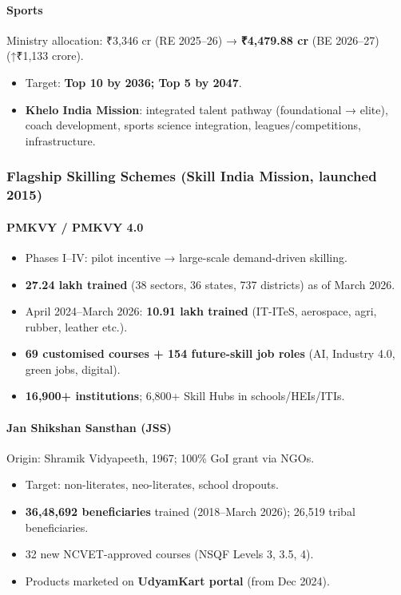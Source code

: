 \paragraph{Sports} Ministry allocation: ₹3,346 cr (RE 2025--26) → \textbf{₹4,479.88 cr} (BE 2026--27) (↑₹1,133 crore).
\begin{itemize}
  \item Target: \textbf{Top 10 by 2036; Top 5 by 2047}.
  \item \textbf{Khelo India Mission}: integrated talent pathway (foundational → elite), coach development, sports science integration, leagues/competitions, infrastructure.
\end{itemize}

\subsubsection*{Flagship Skilling Schemes (Skill India Mission, launched 2015)}

\paragraph{PMKVY / PMKVY 4.0}
\begin{itemize}
  \item Phases I--IV: pilot incentive → large-scale demand-driven skilling.
  \item \textbf{27.24 lakh trained} (38 sectors, 36 states, 737 districts) as of March 2026.
  \item April 2024--March 2026: \textbf{10.91 lakh trained} (IT-ITeS, aerospace, agri, rubber, leather etc.).
  \item \textbf{69 customised courses + 154 future-skill job roles} (AI, Industry 4.0, green jobs, digital).
  \item \textbf{16,900+ institutions}; 6,800+ Skill Hubs in schools/HEIs/ITIs.
\end{itemize}

\paragraph{Jan Shikshan Sansthan (JSS)} Origin: Shramik Vidyapeeth, 1967; 100\% GoI grant via NGOs.
\begin{itemize}
  \item Target: non-literates, neo-literates, school dropouts.
  \item \textbf{36,48,692 beneficiaries} trained (2018--March 2026); 26,519 tribal beneficiaries.
  \item 32 new NCVET-approved courses (NSQF Levels 3, 3.5, 4).
  \item Products marketed on \textbf{UdyamKart portal} (from Dec 2024).
\end{itemize}

